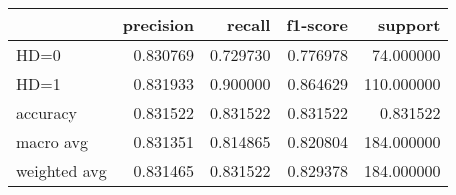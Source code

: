 \begin{tabular}{lrrrr}
\toprule
{} &  precision &    recall &  f1-score &     support \\
\midrule
HD=0         &   0.830769 &  0.729730 &  0.776978 &   74.000000 \\
HD=1         &   0.831933 &  0.900000 &  0.864629 &  110.000000 \\
accuracy     &   0.831522 &  0.831522 &  0.831522 &    0.831522 \\
macro avg    &   0.831351 &  0.814865 &  0.820804 &  184.000000 \\
weighted avg &   0.831465 &  0.831522 &  0.829378 &  184.000000 \\
\bottomrule
\end{tabular}

